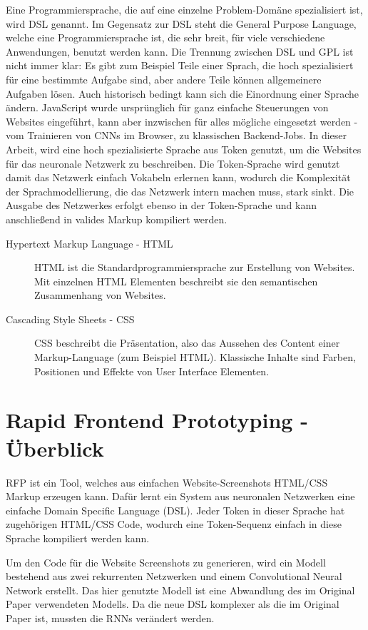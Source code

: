 \documentclass[pdftex,a4paper,halfparskip, article]{scrartcl}
\begin{document}
Eine Programmiersprache, die auf eine einzelne Problem-Domäne spezialisiert ist, wird DSL genannt. Im Gegensatz zur DSL steht die General Purpose Language, welche eine Programmiersprache ist, die sehr breit, für viele verschiedene Anwendungen, benutzt werden kann. Die Trennung zwischen DSL und GPL ist nicht immer klar: Es gibt zum Beispiel Teile einer Sprach, die hoch spezialisiert für eine bestimmte Aufgabe sind, aber andere Teile können allgemeinere Aufgaben lösen. Auch historisch bedingt kann sich die Einordnung einer Sprache ändern. JavaScript wurde ursprünglich für ganz einfache Steuerungen von Websites eingeführt, kann aber inzwischen für alles mögliche eingesetzt werden - vom Trainieren von CNNs im Browser, zu klassischen Backend-Jobs. 
In dieser Arbeit, wird eine hoch spezialisierte Sprache aus Token genutzt, um die Websites für das neuronale Netzwerk zu beschreiben. Die Token-Sprache wird genutzt damit das Netzwerk einfach Vokabeln erlernen kann, wodurch die Komplexität der Sprachmodellierung, die das Netzwerk intern machen muss, stark sinkt. Die Ausgabe des Netzwerkes erfolgt ebenso in der Token-Sprache und kann anschließend in valides Markup kompiliert werden.

\begin{description}
	\item[Hypertext Markup Language - HTML] HTML ist die Standardprogrammiersprache zur Erstellung von Websites. Mit einzelnen HTML Elementen beschreibt sie den semantischen Zusammenhang von Websites.
	\item[Cascading Style Sheets - CSS] CSS beschreibt die Präsentation, also das Aussehen des Content einer Markup-Language (zum Beispiel HTML). Klassische Inhalte sind Farben, Positionen und Effekte von User Interface Elementen.
\end{description}



 
\newpage
\section{Rapid Frontend Prototyping - Überblick}\label{sec:rfp}

RFP ist ein Tool, welches aus einfachen Website-Screenshots HTML/CSS Markup erzeugen kann. Dafür lernt ein System aus neuronalen Netzwerken eine einfache Domain Specific Language (DSL). Jeder Token in dieser Sprache hat zugehörigen HTML/CSS Code, wodurch eine Token-Sequenz einfach in diese Sprache kompiliert werden kann.

Um den Code für die Website Screenshots zu generieren, wird ein Modell bestehend aus zwei rekurrenten Netzwerken und einem Convolutional Neural Network erstellt. Das hier genutzte Modell ist eine Abwandlung des im Original Paper verwendeten Modells. Da die neue DSL komplexer als die im Original Paper\cite{Beltramelli17} ist, mussten die RNNs verändert werden. 
\end{document}
